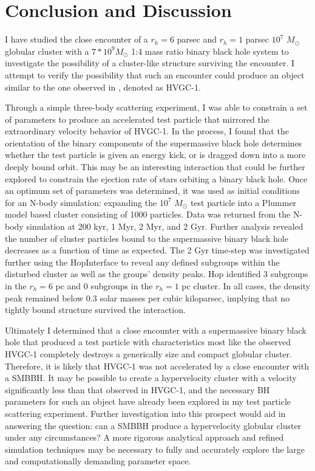 \documentclass{aastex62}
\begin{document}
\section{Conclusion and Discussion}
I have studied the close encounter of a $r_{h} = 6$ parsec and $r_{h} = 1$ parsec $10^7$ $M_{\odot}$ globular cluster with a $7*10^9 M_{\odot}$ 1:4 mass ratio binary black hole system to investigate the possibility of a cluster-like structure surviving the encounter. I attempt to verify the possibility that such an encounter could produce an object similar to the one observed in \citet{cald14}, denoted as HVGC-1. 

Through a simple three-body scattering experiment, I was able to constrain a set of parameters to produce an accelerated test particle that mirrored the extraordinary velocity behavior of HVGC-1. In the process, I found that the orientation of the binary components of the supermassive black hole determines whether the test particle is given an energy kick, or is dragged down into a more deeply bound orbit. This may be an interesting interaction that could be further explored to constrain the ejection rate of stars orbiting a binary black hole. Once an optimum set of parameters was determined, it was used as initial conditions for an N-body simulation: expanding the $10^7$ $M_{\odot}$ test particle into a Plummer model based cluster consisting of 1000 particles. Data was returned from the N-body simulation at 200 kyr, 1 Myr, 2 Myr, and 2 Gyr. Further analysis revealed the number of cluster particles bound to the supermassive binary black hole decreases as a function of time as expected. The 2 Gyr time-step was investigated further using the HopInterface to reveal any defined subgroups within the disturbed cluster as well as the groups' density peaks. Hop identified 3 subgroups in the $r_{h} = 6$ pc and 0 subgroups in the $r_{h} = 1$ pc cluster. In all cases, the density peak remained below $0.3$ solar masses per cubic kiloparsec, implying that no tightly bound structure survived the interaction. 

Ultimately I determined that a close encounter with a supermassive binary black hole that produced a test particle with characteristics most like the observed HVGC-1 completely destroys a generically size and compact globular cluster. Therefore, it is likely that HVGC-1 was not accelerated by a close encounter with a SMBBH. It may be possible to create a hypervelocity cluster with a velocity significantly less than that observed in HVGC-1, and the necessary BH parameters for such an object have already been explored in my test particle scattering experiment. Further investigation into this prospect would aid in answering the question: can a SMBBH produce a hypervelocity globular cluster under any circumstances? A more rigorous analytical approach and refined simulation techniques may be necessary to fully and accurately explore the large and computationally demanding parameter space.
\end{document}
